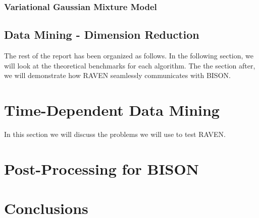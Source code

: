 \documentclass[11pt]{article}
\begin{document}
\subsubsection{Variational Gaussian Mixture Model}

\subsection{Data Mining - Dimension Reduction}

The rest of the report has been organized as follows. In the following section, we will look at the theoretical benchmarks for each algorithm. The the section after, we will demonstrate how RAVEN seamlessly communicates with BISON.  

\section{Time-Dependent Data Mining}

In this section we will discuss the problems we will use to test RAVEN. 

\section{Post-Processing for BISON}



\section{Conclusions}
\end{document}
